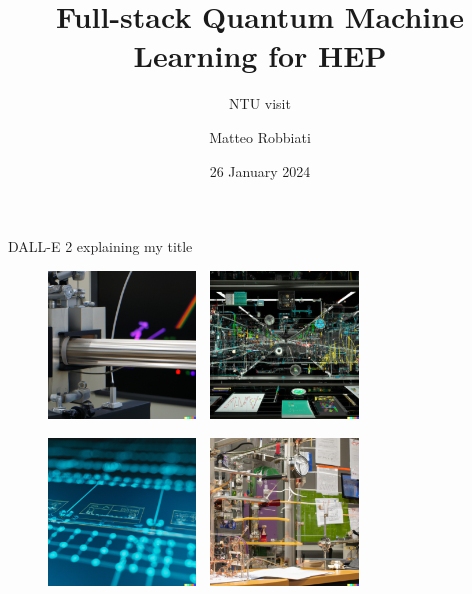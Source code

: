 \documentclass[8pt, xcolor={svgnames}, hyperref={linkcolor=black}]{beamer}
\title{Full-stack Quantum Machine Learning for HEP}
\subtitle{NTU visit}
\date{26 January 2024}
\author[Matteo Robbiati]{Matteo Robbiati}
\begin{document}
\maketitle

\begin{frame}{DALL-E 2 explaining my title}
\begin{figure}  
    \includegraphics[width=0.35\textwidth]{figures/dalle1.png}%
    \,\,
    \includegraphics[width=0.35\textwidth]{figures/dalle2.png}

    \includegraphics[width=0.35\textwidth]{figures/dalle3.png}%
    \,\,
    \includegraphics[width=0.35\textwidth]{figures/dalle4.png}
\end{figure}
\end{frame}
\end{document}
